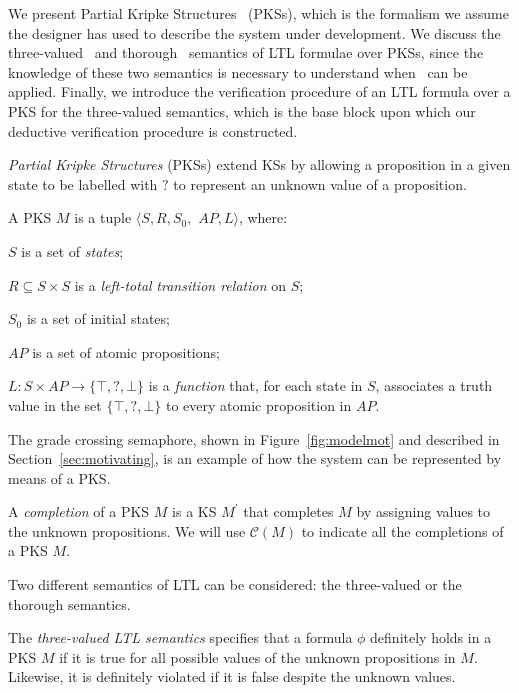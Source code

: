 We present Partial Kripke Structures~\cite{bruns1999model} (PKSs), which is the formalism we assume the designer has used to describe the system under development.
We discuss the three-valued~\cite{bruns1999model} and thorough~\cite{bruns2000model} semantics of LTL formulae over PKSs, since the knowledge of these two semantics is necessary to understand when \NAME\ can be applied.
Finally, we introduce the verification procedure of an LTL formula over a PKS for the three-valued semantics, which is the base block upon which our deductive verification procedure is constructed.


\emph{Partial Kripke Structures} (PKSs) extend KSs by allowing a proposition in a given state to be labelled with $?$ to represent an unknown value of a proposition. 

\begin{definition}
A PKS $M$ is a tuple $\langle S, R, S_0,$ $ AP, L \rangle$,
where:
\begin{enumerate*}
\item[] $S$ is a set of \emph{states};
\item[] $R\subseteq S\times S$ is a \emph{left-total} \emph{transition relation} on $S$;
\item[] $S_0$ is a set of initial states;
\item[] $AP$ is a set of atomic propositions;
\item[] $L: S\times AP\rightarrow \{\top,?,\bot\}$ is a \emph{function} that, for each state in $S$, associates a truth value in the set $\{\top,?,\bot\}$ to every atomic proposition in $AP$.
\end{enumerate*}  
\end{definition}

The grade crossing semaphore, shown in Figure~\ref{fig:modelmot} and described in Section~\ref{sec:motivating}, is an example of how the system can be represented by means of a PKS.

A \emph{completion} of a PKS $M$ is a KS $M^\prime$ that completes $M$ by assigning values to the unknown propositions.
We will use $\mathcal{C}(M)$ to indicate all the completions of a PKS $M$.


Two different semantics of LTL can be considered: the three-valued or the thorough semantics.

The \emph{three-valued LTL semantics} specifies that a formula $\phi$ definitely holds in a PKS $M$ if it is true for all possible values of the unknown propositions in $M$. 
Likewise, it is definitely violated if it is false despite the unknown values.

